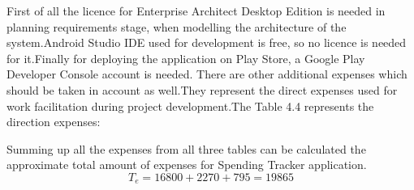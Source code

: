 First of all the licence for Enterprise Architect Desktop Edition is needed in planning requirements stage, when modelling the architecture of the system.Android Studio IDE used for development is free, so no licence is needed for it.Finally for deploying the application on Play Store, a Google Play Developer Console account is needed.
There are other additional expenses which should be taken in account as well.They represent the direct expenses used for work facilitation during project development.The Table 4.4 represents the direction expenses:
\begin{table}[H]
	\centering
	\caption{Direct expenses}
	\label{my-label}
\end{table}
Summing up all the expenses from all three tables can be calculated the approximate total amount of expenses for Spending Tracker application.
\begin{equation}
T_{e} = 16800 + 2270 + 795 = 19865
\end{equation}
